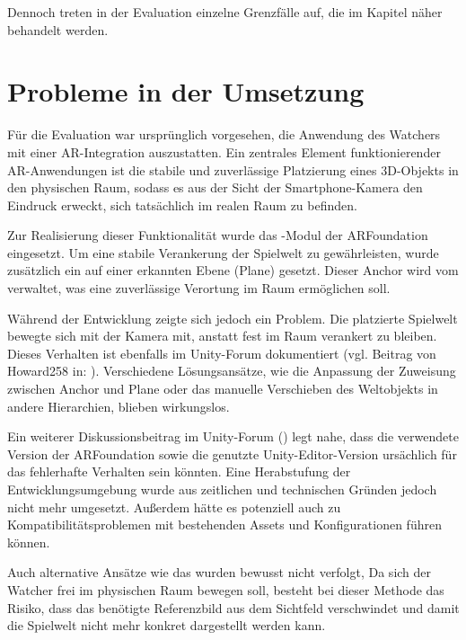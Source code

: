 Dennoch treten in der Evaluation einzelne Grenzfälle auf, die im Kapitel  näher behandelt werden.

\section{Probleme in der Umsetzung}

Für die Evaluation war ursprünglich vorgesehen, die Anwendung des Watchers mit einer \ac{AR}-Integration auszustatten. Ein zentrales Element funktionierender \ac{AR}-Anwendungen ist die stabile und zuverlässige Platzierung eines \ac{3D}-Objekts in den physischen Raum, sodass es aus der Sicht der Smartphone-Kamera den Eindruck erweckt, sich tatsächlich im realen Raum zu befinden.

Zur Realisierung dieser Funktionalität wurde das -Modul der ARFoundation eingesetzt. Um eine stabile Verankerung der Spielwelt zu gewährleisten, wurde zusätzlich ein  auf einer erkannten Ebene (Plane) gesetzt. Dieser Anchor wird vom  verwaltet, was eine zuverlässige Verortung im Raum ermöglichen soll.

Während der Entwicklung zeigte sich jedoch ein Problem. Die platzierte Spielwelt bewegte sich mit der Kamera mit, anstatt fest im Raum verankert zu bleiben. Dieses Verhalten ist ebenfalls im Unity-Forum dokumentiert (vgl. Beitrag von Howard258 in: \citealp{howard258_unity_2025}). Verschiedene Lösungsansätze, wie die Anpassung der Zuweisung zwischen Anchor und Plane oder das manuelle Verschieben des Weltobjekts in andere Hierarchien, blieben wirkungslos.

Ein weiterer Diskussionsbeitrag im Unity-Forum (\citealp{aardruss_ar_2023}) legt nahe, dass die verwendete Version der ARFoundation sowie die genutzte Unity-Editor-Version ursächlich für das fehlerhafte Verhalten sein könnten. Eine Herabstufung der Entwicklungsumgebung wurde aus zeitlichen und technischen Gründen jedoch nicht mehr umgesetzt. Außerdem hätte es potenziell auch zu Kompatibilitätsproblemen mit bestehenden Assets und Konfigurationen führen können.

Auch alternative Ansätze wie das  wurden bewusst nicht verfolgt, Da sich der Watcher frei im physischen Raum bewegen soll, besteht bei dieser Methode das Risiko, dass das benötigte Referenzbild aus dem Sichtfeld verschwindet und damit die Spielwelt nicht mehr konkret dargestellt werden kann.